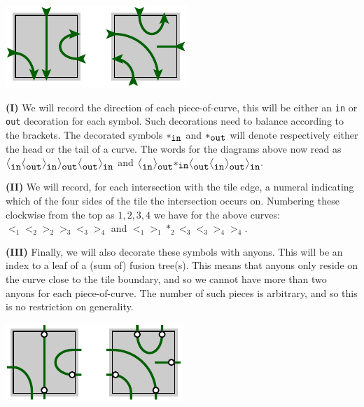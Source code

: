 \documentclass[aps, letterpaper, onecolumn, superscriptaddress, notitlepage, 10pt]{revtex4-1}
\begin{document}
\begin{center}
\includegraphics[]{pic-cells-1.pdf}
\end{center}

{\bf (I)} We will record the direction of each piece-of-curve,
this will be either an {\tt in} or {\tt out} decoration for each symbol.
Such decorations need to balance according to the brackets.
The decorated symbols $*_{\mbox{\tt in}}$ and 
$*_{\mbox{\tt out}}$ 
will denote respectively either
the head or the tail of a curve.
The words for the diagrams above now read as
$ \bigl<_{\mbox{\tt in}}\bigl<_{\mbox{\tt out}}\bigr>_{\mbox{\tt in}}
    \bigr>_{\mbox{\tt out}}\bigl<_{\mbox{\tt out}}\bigr>_{\mbox{\tt in}}$
and
$ \bigl<_{\mbox{\tt in}}\bigl>_{\mbox{\tt out}}*_{\mbox{\tt in}}
    \bigr<_{\mbox{\tt out}}
    \bigr<_{\mbox{\tt in}}\bigl>_{\mbox{\tt out}}\bigr>_{\mbox{\tt in}}.
$

{\bf (II)} We will record,
for each intersection with the tile edge, 
a numeral indicating which of the four
sides of the tile the
intersection occurs on.
Numbering these clockwise from the top as $1, 2, 3, 4$ we have for the above curves: 
$\bigl<_1\bigl<_2\bigr>_2\bigr>_3\bigl<_3\bigr>_4$ 
and $\bigl<_1\bigr>_1*_2\bigl<_3\bigl<_3\bigr>_4\bigr>_4.$

{\bf (III)} Finally, we will also decorate these symbols with anyons.
This will be an index to a leaf of a (sum of) fusion tree(s).
This means that anyons only reside on the curve close
to the tile boundary,
and so we cannot have more than two anyons
for each piece-of-curve. 
The number of such pieces is arbitrary, and so this
is no restriction on generality.

\begin{center}
\includegraphics[]{pic-cells-2.pdf}
\end{center}
\end{document}
